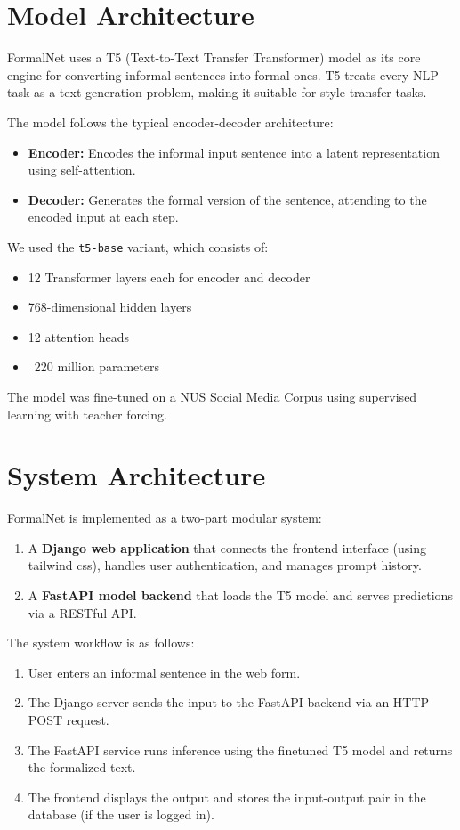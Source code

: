 \section{Model Architecture}
FormalNet uses a T5 (Text-to-Text Transfer Transformer) model as its core engine for converting informal sentences into formal ones. T5 treats every NLP task as a text generation problem, making it suitable for style transfer tasks.

The model follows the typical encoder-decoder architecture:
\begin{itemize}
  \item \textbf{Encoder:} Encodes the informal input sentence into a latent representation using self-attention.
  \item \textbf{Decoder:} Generates the formal version of the sentence, attending to the encoded input at each step.
\end{itemize}

We used the \texttt{t5-base} variant, which consists of:
\begin{itemize}
  \item 12 Transformer layers each for encoder and decoder
  \item 768-dimensional hidden layers
  \item 12 attention heads
  \item ~220 million parameters
\end{itemize}

The model was fine-tuned on a NUS Social Media Corpus\cite{NUS_Dataset} using supervised learning with teacher forcing.

\section{System Architecture}
FormalNet is implemented as a two-part modular system:
\begin{enumerate}
  \item A \textbf{Django web application} that connects the frontend interface (using tailwind css), handles user authentication, and manages prompt history.
  \item A \textbf{FastAPI model backend} that loads the T5 model and serves predictions via a RESTful API.
\end{enumerate}

The system workflow is as follows:
\begin{enumerate}
  \item User enters an informal sentence in the web form.
  \item The Django server sends the input to the FastAPI backend via an HTTP POST request.
  \item The FastAPI service runs inference using the finetuned T5 model and returns the formalized text.
  \item The frontend displays the output and stores the input-output pair in the database (if the user is logged in).
\end{enumerate}


